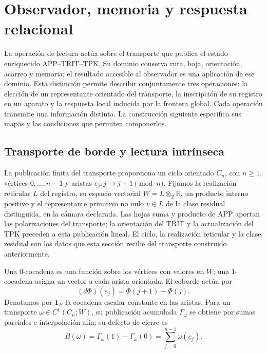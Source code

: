 
\section{Observador, memoria y respuesta relacional}
\label{vii:sec:observador-respuesta}

La operación de lectura actúa sobre el transporte que publica el estado
enriquecido APP--TRIT--TPK. Su dominio conserva ruta, hoja, orientación,
acarreo y memoria; el resultado accesible al observador es una aplicación
de ese dominio. Esta distinción permite describir conjuntamente tres
operaciones: la elección de un representante orientado del transporte,
la inscripción de su registro en un aparato y la respuesta local inducida
por la frontera global. Cada operación transmite una información distinta.
La construcción siguiente especifica sus mapas y las condiciones que
permiten componerlos.

\subsection{Transporte de borde y lectura intrínseca}
\label{vii:sec:observador-ciclo}

La publicación finita del transporte proporciona un ciclo orientado
\(C_n\), con \(n\geq1\), vértices \(0,\ldots,n-1\) y aristas
\(e_j:j\longrightarrow j+1\pmod n\). Fijamos la realización reticular
\(L\) del registro, su espacio vectorial
\(W=L\otimes_{\mathbb Z}\mathbb R\), un producto interno positivo y
el representante primitivo no nulo \(v\in L\) de la clase residual
distinguida, en la cámara declarada. Las hojas suma y producto de APP
aportan las polarizaciones del transporte; la orientación del TRIT y la
actualización del TPK preceden a esta publicación lineal. El ciclo,
la realización reticular y la clase residual son los datos que esta
sección recibe del transporte construido anteriormente.

Una \(0\)-cocadena es una función sobre los vértices con valores en
\(W\); una \(1\)-cocadena asigna un vector a cada arista orientada.
El coborde actúa por
\[
 (d\Phi)(e_j)=\Phi(j+1)-\Phi(j).
\]
Denotamos por \(\mathbf1_E\) la cocadena escalar constante en las
aristas. Para un transporte \(\omega\in C^1(C_n;W)\), su publicación
acumulada \(\Gamma_\omega\) se obtiene por sumas parciales e
interpolación afín; su defecto de cierre es
\begin{equation}
 B(\omega)=\Gamma_\omega(1)-\Gamma_\omega(0)
 =\sum_{j=0}^{n-1}\omega(e_j).
 \label{vii:eq:observador-defecto}
\end{equation}

